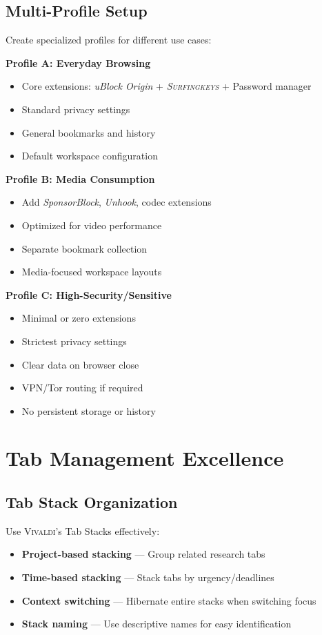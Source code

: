 \documentclass[11pt,a4paper,oneside]{book}
\newcommand{\vivaldi}{\textsc{Vivaldi}}
\newcommand{\surfingkeys}{\textsc{Surfingkeys}}
\newcommand{\extension}[1]{\textit{\color{primaryblue}#1}}
\begin{document}
\subsection{Multi-Profile Setup}

Create specialized profiles for different use cases:

\textbf{Profile A: Everyday Browsing}
\begin{itemize}
    \item Core extensions: \extension{uBlock Origin} + \extension{\surfingkeys{}} + Password manager
    \item Standard privacy settings
    \item General bookmarks and history
    \item Default workspace configuration
\end{itemize}

\textbf{Profile B: Media Consumption}
\begin{itemize}
    \item Add \extension{SponsorBlock}, \extension{Unhook}, codec extensions
    \item Optimized for video performance
    \item Separate bookmark collection
    \item Media-focused workspace layouts
\end{itemize}

\textbf{Profile C: High-Security/Sensitive}
\begin{itemize}
    \item Minimal or zero extensions
    \item Strictest privacy settings
    \item Clear data on browser close
    \item VPN/Tor routing if required
    \item No persistent storage or history
\end{itemize}

\section{Tab Management Excellence}

\subsection{Tab Stack Organization}

Use \vivaldi{}'s Tab Stacks effectively:

\begin{itemize}
    \item \textbf{Project-based stacking} — Group related research tabs
    \item \textbf{Time-based stacking} — Stack tabs by urgency/deadlines  
    \item \textbf{Context switching} — Hibernate entire stacks when switching focus
    \item \textbf{Stack naming} — Use descriptive names for easy identification
\end{itemize}
\end{document}
